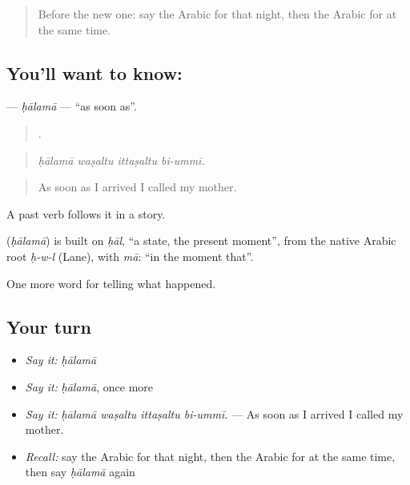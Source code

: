 \label{lesson:AR-C327-halama}



\begin{quote}
Before the new one: say the Arabic for that night, then the Arabic for at the same time.
\end{quote}

\subsection*{You'll want to know: }
\textbf{} — \emph{ḥālamā} — \textquotedblleft{}as soon as\textquotedblright{}.

\begin{quote}
   .
\end{quote}

\begin{quote}
\emph{ḥālamā waṣaltu ittaṣaltu bi-ummī.}
\end{quote}

\begin{quote}
As soon as I arrived I called my mother.
\end{quote}

A past verb follows it in a story.

\begin{cousinweb}
\textbf{} (\emph{ḥālamā}) is built on \emph{ḥāl}, \textquotedblleft{}a state, the present moment\textquotedblright{}, from the native Arabic root \emph{ḥ-w-l} (Lane), with \emph{mā}: \textquotedblleft{}in the moment that\textquotedblright{}.
\end{cousinweb}

\begin{grammarlens}[title={What you've built}]
One more word for telling what happened.
\end{grammarlens}

\subsection*{Your turn}
\begin{itemize}
\raggedright
  \item \emph{Say it:} \emph{ḥālamā}
  \item \emph{Say it:} \emph{ḥālamā}, once more
  \item \emph{Say it:} \emph{ḥālamā waṣaltu ittaṣaltu bi-ummī.} — As soon as I arrived I called my mother.
  \item \emph{Recall:} say the Arabic for that night, then the Arabic for at the same time, then say \emph{ḥālamā} again
\end{itemize}

